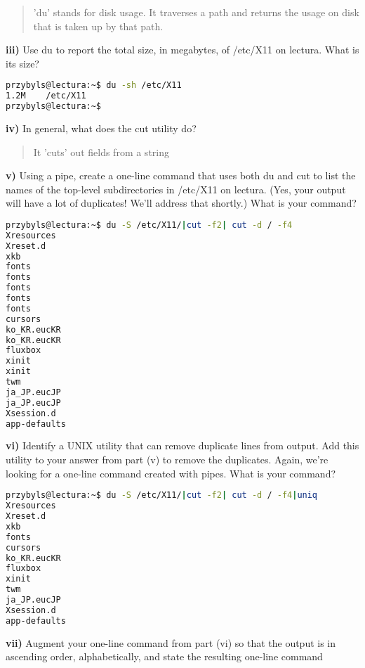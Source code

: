 \documentclass[11pt,notitlepage]{article}
\newcommand{\subquestion}[2]{\par\hspace{0.5cm} \textbf{#1)} #2}
\begin{document}
\begin{quote}
  'du' stands for disk usage. It traverses a path and returns the
  usage on disk that is taken up by that path.
\end{quote}

\subquestion{iii}{Use du to report the total size, in megabytes, of
/etc/X11 on lectura. What is its size?}

\begin{lstlisting}[language=bash,basicstyle=\scriptsize,backgroundcolor=\color{ubergray},caption={trnapp-config.xml},frame=single,breaklines=true]
przybyls@lectura:~$ du -sh /etc/X11
1.2M	/etc/X11
przybyls@lectura:~$ 
\end{lstlisting}

\subquestion{iv}{In general, what does the cut utility do?}

\begin{quote}
  It 'cuts' out fields from a string
\end{quote}

\subquestion{v}{Using a pipe, create a one-line command that uses both du and cut to list the names of
the top-level subdirectories in /etc/X11 on lectura. (Yes, your output will have a lot of
duplicates! We’ll address that shortly.) What is your command?}

\begin{lstlisting}[language=bash,basicstyle=\scriptsize,backgroundcolor=\color{ubergray},caption={trnapp-config.xml},frame=single,breaklines=true]
przybyls@lectura:~$ du -S /etc/X11/|cut -f2| cut -d / -f4
Xresources
Xreset.d
xkb
fonts
fonts
fonts
fonts
fonts
cursors
ko_KR.eucKR
ko_KR.eucKR
fluxbox
xinit
xinit
twm
ja_JP.eucJP
ja_JP.eucJP
Xsession.d
app-defaults
\end{lstlisting}

\subquestion{vi}{Identify a UNIX utility that can remove duplicate lines from output. Add this utility to
your answer from part (v) to remove the duplicates. Again, we’re looking for a one-line
command created with pipes. What is your command?}

\begin{lstlisting}[language=bash,basicstyle=\scriptsize,backgroundcolor=\color{ubergray},caption={trnapp-config.xml},frame=single,breaklines=true]
przybyls@lectura:~$ du -S /etc/X11/|cut -f2| cut -d / -f4|uniq
Xresources
Xreset.d
xkb
fonts
cursors
ko_KR.eucKR
fluxbox
xinit
twm
ja_JP.eucJP
Xsession.d
app-defaults
\end{lstlisting}

\subquestion{vii}{Augment your one-line command from part (vi) so that the output is in ascending order,
alphabetically, and state the resulting one-line command}
\end{document}
